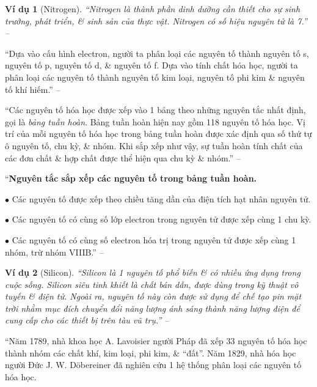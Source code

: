 \documentclass{article}
\numberwithin{equation}{section}
\newtheorem{vidu}{Ví dụ}[section]
\begin{document}
\begin{vidu}[Nitrogen]
	``Nitrogen là thành phần dinh dưỡng cần thiết cho sự sinh trưởng, phát triển, \& sinh sản của thực vật. Nitrogen có số hiệu nguyên tử là 7.'' -- \cite[p. 40]{SGK_Hoa_Hoc_10_Chan_Troi_Sang_Tao}
\end{vidu}
``Dựa vào cấu hình electron, người ta phân loại các nguyên tố thành nguyên tố s, nguyên tố p, nguyên tố d, \& nguyên tố f. Dựa vào tính chất hóa học, người ta phân loại các nguyên tố thành nguyên tố kim loại, nguyên tố phi kim \& nguyên tố khí hiếm.'' -- \cite[p. 40]{SGK_Hoa_Hoc_10_Chan_Troi_Sang_Tao}

``Các nguyên tố hóa học được xếp vào 1 bảng theo những nguyên tắc nhất định, gọi là \textit{bảng tuần hoàn}. Bảng tuần hoàn hiện nay gồm 118 nguyên tố hóa học. Vị trí của mỗi nguyên tố hóa học trong bảng tuần hoàn được xác định qua số thứ tự ô nguyên tố, chu kỳ, \& nhóm. Khi sắp xếp như vậy, sự tuần hoàn tính chất của các đơn chất \& hợp chất được thể hiện qua chu kỳ \& nhóm.'' -- \cite[p. 40]{SGK_Hoa_Hoc_10_Chan_Troi_Sang_Tao}

``\textbf{Nguyên tắc sắp xếp các nguyên tố trong bảng tuần hoàn.}
\begin{enumerate*}
	\item[$\bullet$] Các nguyên tố được xếp theo chiều tăng dần của điện tích hạt nhân nguyên tử.
	\item[$\bullet$] Các nguyên tố có cùng số lớp electron trong nguyên tử được xếp cùng 1 chu kỳ.
	\item[$\bullet$] Các nguyên tố có cùng số electron hóa trị trong nguyên tử được xếp cùng 1 nhóm, trừ nhóm VIIIB.'' -- \cite[p. 40]{SGK_Hoa_Hoc_10_Chan_Troi_Sang_Tao}
\end{enumerate*}

\begin{vidu}[Silicon]
	``Silicon là 1 nguyên tố phổ biến \& có nhiều ứng dụng trong cuộc sống. Silicon siêu tinh khiết là chất bán dẫn, được dùng trong kỹ thuật vô tuyến \& điện tử. Ngoài ra, nguyên tố này còn được sử dụng để chế tạo pin mặt trời nhằm mục đích chuyển đổi năng lượng ánh sáng thành năng lượng điện để cung cấp cho các thiết bị trên tàu vũ trụ.'' -- \cite[p. 40]{SGK_Hoa_Hoc_10_Chan_Troi_Sang_Tao}
\end{vidu}
``Năm 1789, nhà khoa học A. Lavoisier người Pháp đã xếp 33 nguyên tố hóa học thành nhóm các chất khí, kim loại, phi kim, \& ``đất''. Năm 1829, nhà hóa học người Đức J. W. D\"obereiner đã nghiên cứu 1 hệ thống phân loại các nguyên tố hóa học.
\end{document}
